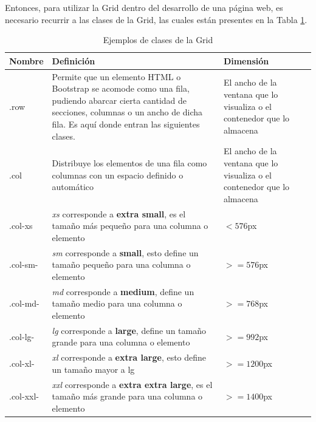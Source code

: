 Entonces, para utilizar la Grid dentro del desarrollo de una página web, es necesario recurrir a las clases de la Grid, las cuales están presentes en la Tabla \ref{tab:1}.
\begin{table}[H]
    \centering
    \caption{Ejemplos de clases de la Grid}
    \label{tab:1}
    \begin{tabular}{m{2cm} m{6cm} m{5cm}}
        \hline
        \textbf{Nombre} & \textbf{Definición} & \textbf{Dimensión} \\
        \hline
        .row        & \parbox{6cm}{Permite que un elemento HTML o Bootstrap se acomode como una fila, pudiendo abarcar cierta cantidad de secciones, columnas o un ancho de dicha fila. Es aquí donde entran las siguientes clases.} & \parbox{5cm}{El ancho de la ventana que lo visualiza o el contenedor que lo almacena} \\
        \hline
        .col        & \parbox{6cm}{Distribuye los elementos de una fila como columnas con un espacio definido o automático} & \parbox{5cm}{El ancho de la ventana que lo visualiza o el contenedor que lo almacena} \\
        \hline
        .col-xs     & \parbox{6cm}{\textit{xs} corresponde a \textbf{extra small}, es el tamaño más pequeño para una columna o elemento}        & $<576$px \\
        \hline
        .col-sm-    & \parbox{6cm}{\textit{sm} corresponde a \textbf{small}, esto define un tamaño pequeño para una columna o elemento}              & $>=576$px \\
        \hline
        .col-md-    & \parbox{6cm}{\textit{md} corresponde a \textbf{medium}, define un tamaño medio para una columna o elemento}               & $>=768$px \\
        \hline
        .col-lg-    & \parbox{6cm}{\textit{lg} corresponde a \textbf{large}, define un tamaño grande para una columna o elemento}                & $>=992$px \\
        \hline
        .col-xl-    & \parbox{6cm}{\textit{xl} corresponde a \textbf{extra large}, esto define un tamaño mayor a lg}                                  & $>=1200$px \\
        \hline
        .col-xxl-   & \parbox{6cm}{\textit{xxl} corresponde a \textbf{extra extra large}, es el tamaño más grande para una columna o elemento}   & $>=1400$px \\
        \hline
    \end{tabular}
\end{table}

